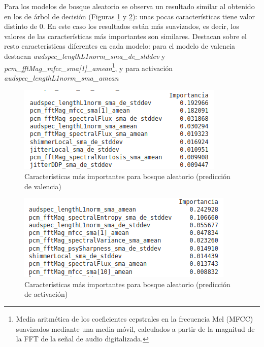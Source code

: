 \documentclass[12pt,a4paper]{article}
\begin{document}
Para los modelos de bosque aleatorio se observa un resultado similar al obtenido en los de árbol de decisión (Figuras \ref{fig:importrandomforestval} y \ref{fig:importrandomforestar}): unas pocas características tiene valor distinto de 0. En este caso los resultados están más suavizados, es decir, los valores de las características más importantes son similares. Destacan sobre el resto características diferentes en cada modelo: para el modelo de valencia destacan \textit{audspec\_lengthL1norm\_sma\_de\_stddev} y \textit{pcm\_fftMag\_mfcc\_sma[1]\_amean}\footnote{Media aritmética de los coeficientes cepstrales en la frecuencia Mel (MFCC) suavizados mediante una media móvil, calculados a partir de la magnitud de la FFT de la señal de audio digitalizada.}, y para activación \textit{audspec\_lengthL1norm\_sma\_amean}
\begin{figure}[H]
	\centering
	\includegraphics[width=0.7\linewidth]{figs/import_random_forest_val}
	\caption{Características más importantes para bosque aleatorio (predicción de valencia)}
	\label{fig:importrandomforestval}
\end{figure}
\begin{figure}[H]
	\centering
	\includegraphics[width=0.7\linewidth]{figs/import_random_forest_ar}
	\caption{Características más importantes para bosque aleatorio (predicción de activación)}
	\label{fig:importrandomforestar}
\end{figure}
\end{document}
